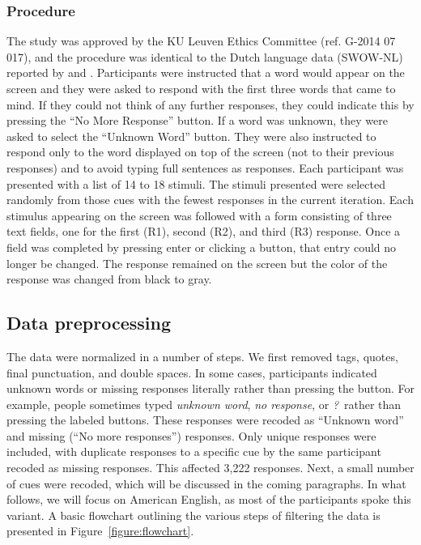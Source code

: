\documentclass[a4paper,doc,natbib,floatsintext]{apa6}
\newcommand{\stim}[1]{\textsl{#1}}
\begin{document}
\subsubsection{Procedure}
The study was approved by the KU Leuven Ethics Committee (ref. G-2014 07 017), and the procedure was identical to the Dutch language data (SWOW-NL) reported by \citet{DeDeyne2008a} and \citet{DeDeyne2013b}. Participants were instructed that a word would appear on the screen and they were asked to respond with the first three words that came to mind. If they could not think of any further responses, they could indicate this by pressing the ``No More Response'' button. If a word was unknown, they were asked to select the ``Unknown Word'' button. They were also instructed to respond only to the word displayed on top of the screen (not to their previous responses) and to avoid typing full sentences as responses. Each participant was presented with a list of 14 to 18 stimuli. The stimuli presented were selected randomly from those cues with the fewest responses in the current iteration. Each stimulus appearing on the screen was followed with a form consisting of three text fields, one for the first (R1), second (R2), and third (R3) response. Once a field was completed by pressing enter or clicking a button, that entry could no longer be changed. The response remained on the screen but the color of the response was changed from black to gray.

\subsection{Data preprocessing}
The data were normalized in a number of steps. We first removed tags, quotes, final punctuation, and double spaces. In some cases, participants indicated unknown words or missing responses literally rather than pressing the button. For example, people sometimes typed \stim{unknown word}, \stim{no response}, or \stim{?}\  rather than pressing the labeled buttons. These responses were recoded as ``Unknown word'' and missing (``No more responses'') responses.
Only unique responses were included, with duplicate responses to a specific cue by the same participant recoded as missing responses. This affected 3,222 responses. Next, a small number of cues were recoded, which will be discussed in the coming paragraphs.
In what follows, we will focus on American English, as most of the participants spoke this variant. A basic flowchart outlining the various steps of filtering the data is presented in Figure~\ref{figure:flowchart}.
\end{document}
